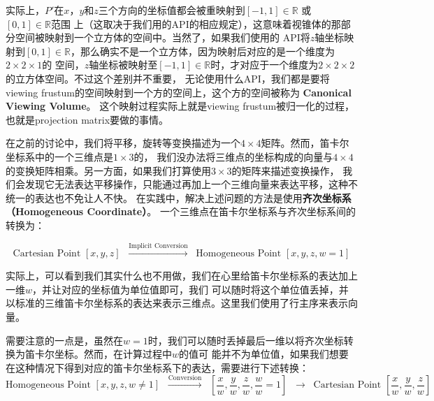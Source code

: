 \documentclass[12pt]{article}
\begin{document}
\indent{}实际上，$P'$在$x$，$y$和$z$三个方向的坐标值都会被重映射到$[-1,1]\in\mathbb{R}$ 或 $[0,1]\in\mathbb{R}$范围
上（这取决于我们用的API的相应规定），这意味着视锥体的那部分空间被映射到一个立方体的空间中。当然了，如果我们使用的
API将$z$轴坐标映射到$[0,1]\in\mathbb{R}$，那么确实不是一个立方体，因为映射后对应的是一个维度为$2\times 2\times 1$的
空间，$z$轴坐标被映射至$[-1,1]\in\mathbb{R}$时，才对应于一个维度为$2\times 2\times 2$的立方体空间。不过这个差别并不重要，
无论使用什么API，我们都是要将viewing frustum的空间映射到一个方的空间上，这个方的空间被称为 \textbf{Canonical Viewing Volume}。
这个映射过程实际上就是viewing frustum被归一化的过程，也就是projection matrix要做的事情。

\indent{}在之前的讨论中，我们将平移，旋转等变换描述为一个$4\times 4$矩阵。然而，笛卡尔坐标系中的一个三维点是$1\times 3$的，
我们没办法将三维点的坐标构成的向量与$4\times 4$的变换矩阵相乘。另一方面，如果我们打算使用$3\times 3$的矩阵来描述变换操作，
我们会发现它无法表达平移操作，只能通过再加上一个三维向量来表达平移，这种不统一的表达也不免让人不快。
在实践中，解决上述问题的方法是使用\textbf{齐次坐标系（Homogeneous Coordinate）}。
一个三维点在笛卡尔坐标系与齐次坐标系间的转换为：

\begin{displaymath}
\textrm{Cartesian Point }[x, y, z] \;\; \overset{\textrm{Implicit Conversion}}{\longrightarrow} \;\;
\textrm{Homogeneous Point }[x, y, z, w=1]
\end{displaymath}

\indent{}实际上，可以看到我们其实什么也不用做，我们在心里给笛卡尔坐标系的表达加上一维$w$，并让对应的坐标值为单位值即可，我们
可以随时将这个单位值丢掉，并以标准的三维笛卡尔坐标系的表达来表示三维点。这里我们使用了行主序来表示向量。

\indent{}需要注意的一点是，虽然在$w=1$时，我们可以随时丢掉最后一维以将齐次坐标转换为笛卡尔坐标。然而，在计算过程中$w$的值可
能并不为单位值，如果我们想要在这种情况下得到对应的笛卡尔坐标系下的表达，需要进行下述转换：
\begin{displaymath}
\textrm{Homogeneous Point }[x, y, z, w\neq 1] \;\; \overset{\textrm{Conversion}}{\longrightarrow} \;\;
[\frac{x}{w},\frac{y}{w},\frac{z}{w},\frac{w}{w}=1]
\;\; \rightarrow \;\; \textrm{Cartesian Point }[\frac{x}{w},\frac{y}{w},\frac{z}{w}]
\end{displaymath}
\end{document}
